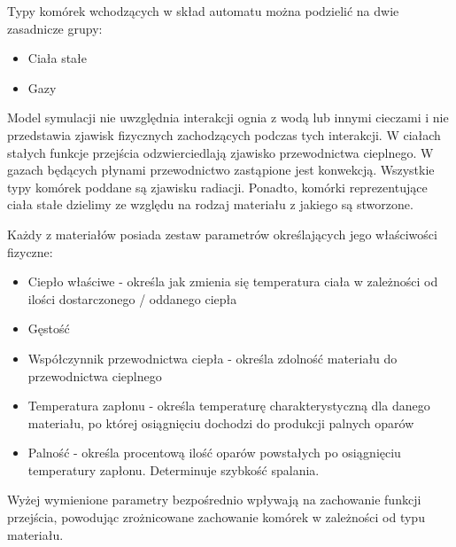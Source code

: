 Typy komórek wchodzących w skład automatu można podzielić na dwie zasadnicze grupy:
\begin{itemize}
\item Ciała stałe
\item Gazy
\end{itemize}
Model symulacji nie uwzględnia interakcji ognia z wodą lub innymi cieczami i nie przedstawia zjawisk fizycznych zachodzących podczas tych interakcji.
W ciałach stałych funkcje przejścia odzwierciedlają zjawisko przewodnictwa cieplnego. W gazach będących płynami przewodnictwo zastąpione jest konwekcją.
Wszystkie typy komórek poddane są zjawisku radiacji.
Ponadto, komórki reprezentujące ciała stałe dzielimy ze względu na rodzaj materiału z jakiego są stworzone.


Każdy z materiałów posiada zestaw parametrów określających jego właściwości fizyczne:
\begin{itemize}
\item Ciepło właściwe - określa jak zmienia się temperatura ciała w zależności od ilości dostarczonego / oddanego ciepła
\item Gęstość
\item Współczynnik przewodnictwa ciepła - określa zdolność materiału do przewodnictwa cieplnego
\item Temperatura zapłonu - określa temperaturę charakterystyczną dla danego materiału, po której osiągnięciu 
	dochodzi do produkcji palnych oparów
\item Palność - określa procentową ilość oparów powstałych po osiągnięciu temperatury zapłonu. Determinuje szybkość spalania.
\end{itemize}
Wyżej wymienione parametry bezpośrednio wpływają na zachowanie funkcji przejścia, powodując zrożnicowane zachowanie komórek w zależności od typu materiału.


